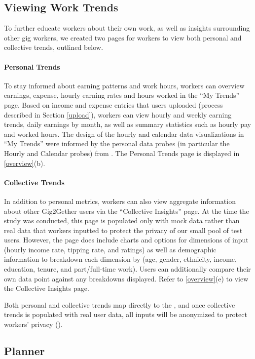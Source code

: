 \subsection{Viewing Work Trends}
To further educate workers about their own work, as well as insights surrounding other gig workers, we created two pages for workers to view both personal and collective trends, outlined below.

\paragraph{Personal Trends} 
To stay informed about earning patterns and work hours, workers can overview earnings, expense, hourly earning rates and hours worked in the ``My Trends'' page. Based on income and expense entries that users uploaded (process described in Section \ref{upload}), workers can view hourly and weekly earning trends, daily earnings by month, as well as summary statistics such as hourly pay and worked hours. The design of the hourly and calendar data visualizations in ``My Trends'' were informed by the personal data probes (in particular the Hourly and Calendar probes) from \citet{zhang2023stakeholder}. The Personal Trends page is displayed in \ref{overview}(b).

\paragraph{Collective Trends} In addition to personal metrics, workers can also view aggregate information about other Gig2Gether users via the ``Collective Insights'' page. At the time the study was conducted, this page is populated only with mock data rather than real data that workers inputted to protect the privacy of our small pool of test users. However, the page does include charts and options for dimensions of input (hourly income rate, tipping rate, and ratings) as well as demographic information to breakdown each dimension by (age, gender, ethnicity, income, education, tenure, and part/full-time work). Users can additionally compare their own data point against any breakdowns displayed. Refer to \ref{overview}(e) to view the Collective Insights page.

Both personal and collective trends map directly to the , and once collective trends is populated with real user data, all inputs will be anonymized to protect workers' privacy ().


\subsection{Planner}

